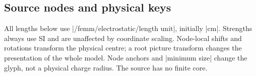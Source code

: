 \Needspace{10cm}
\begin{codeexample}[width=0pt]
\end{codeexample}

\subsection{Source nodes and physical keys}
\label{sec:electric-source-keys}
All lengths below use |/femm/electrostatic/length unit|, initially |cm|.
Strengths always use SI and are unaffected by coordinate scaling. Node-local
shifts and rotations transform the physical centre; a root picture transform
changes the presentation of the whole model. Node anchors and |minimum size|
change the glyph, not a physical charge radius. The source has no finite core.

